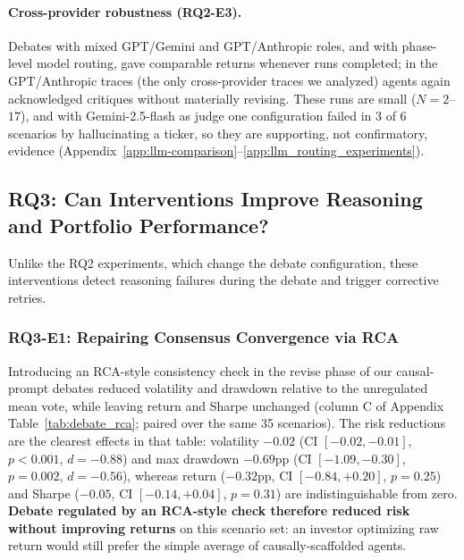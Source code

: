 \documentclass{article}
\begin{document}
\paragraph{Cross-provider robustness (RQ2-E3).}
Debates with mixed GPT/Gemini and GPT/Anthropic roles, and with phase-level model routing,
gave comparable returns whenever runs completed; in the GPT/Anthropic traces (the only
cross-provider traces we analyzed) agents again acknowledged critiques without materially
revising. These runs are small ($N{=}2$--$17$), and with Gemini-2.5-flash as judge one
configuration failed in 3 of 6 scenarios by hallucinating a ticker, so they are supporting, not
confirmatory, evidence (Appendix~\ref{app:llm-comparison}--\ref{app:llm_routing_experiments}).


\subsection{RQ3: Can Interventions Improve Reasoning and Portfolio Performance?}
\vspace{-0.2cm}
Unlike the RQ2 experiments, which change the debate configuration, these interventions detect reasoning failures during the debate and trigger corrective retries.


\vspace{-0.2cm}
\subsubsection{RQ3-E1: Repairing Consensus Convergence via RCA}
\vspace{-0.2cm}
Introducing an RCA-style consistency check in the revise phase of our causal-prompt debates reduced volatility and drawdown relative to the unregulated mean vote, while leaving return and Sharpe unchanged (column C of Appendix Table~\ref{tab:debate_rca}; paired over the same 35 scenarios). The risk reductions are the clearest effects in that table: volatility $-0.02$ (CI $[-0.02,-0.01]$, $p{<}0.001$, $d{=}{-}0.88$) and max drawdown $-0.69$pp (CI $[-1.09,-0.30]$, $p{=}0.002$, $d{=}{-}0.56$), whereas return ($-0.32$pp, CI $[-0.84,+0.20]$, $p{=}0.25$) and Sharpe ($-0.05$, CI $[-0.14,+0.04]$, $p{=}0.31$) are indistinguishable from zero. \textbf{Debate regulated by an RCA-style check therefore reduced risk without improving returns} on this scenario set: an investor optimizing raw return would still prefer the simple average of causally-scaffolded agents. 

\vspace{-0.2cm}
\end{document}
